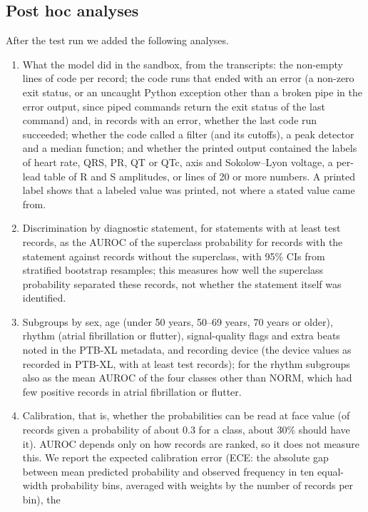 \subsection{Post hoc analyses}\label{sec:posthoc}
After the test run we added the following analyses.
\begin{enumerate}
  \renewcommand{\labelenumi}{(\roman{enumi})}
  \setlength{\itemsep}{0pt}\setlength{\parsep}{0pt}
  \item What the model did in the sandbox, from the transcripts: the non-empty lines of code per record; the code runs
  that ended with an error (a non-zero exit status, or an uncaught Python exception other than a broken pipe in the
  error output, since piped commands return the exit status of the last command) and, in records with an error,
  whether the last code run succeeded; whether the code called a filter (and its cutoffs), a peak detector and a
  median function; and whether the printed output contained the labels of heart rate, QRS, PR, QT or QTc, axis and
  Sokolow--Lyon voltage, a per-lead table of R and S amplitudes, or lines of 20 or more numbers. A printed label shows
  that a labeled value was printed, not where a stated value came from.
  \item Discrimination by diagnostic statement, for statements with at least \PHMinStatement{} test records, as the
  AUROC of the superclass probability for records with the statement against records without the superclass, with
  95\% CIs from \PHNStmtBoot{} stratified bootstrap resamples; this measures how well the superclass probability
  separated these records, not whether the statement itself was identified.
  \item Subgroups by sex, age (under 50 years, 50--69 years, 70 years or older), rhythm (atrial fibrillation or
  flutter), signal-quality flags and extra beats noted in the PTB-XL metadata, and recording device (the device values
  as recorded in PTB-XL, with at least \PHMinSubgroup{} test records); for the rhythm subgroups also as the mean AUROC
  of the four classes other than NORM, which had few positive records in atrial fibrillation or flutter.
  \item Calibration, that is, whether the probabilities can be read at face value (of records given a probability of
  about 0.3 for a class, about 30\% should have it). AUROC depends only on how records are ranked, so it does not
  measure this. We report the expected calibration error (ECE: the absolute gap between mean predicted probability and
  observed frequency in ten equal-width probability bins, averaged with weights by the number of records per bin), the

\end{enumerate}

